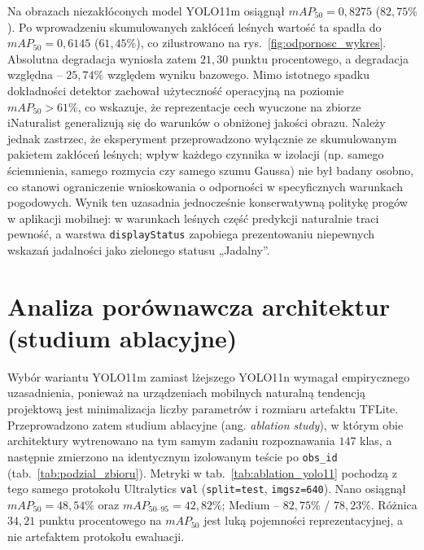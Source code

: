 Na obrazach niezakłóconych model YOLO11m osiągnął $mAP_{50}=0{,}8275$ ($82{,}75\%$). Po wprowadzeniu skumulowanych zakłóceń leśnych wartość ta spadła do $mAP_{50}=0{,}6145$ ($61{,}45\%$), co zilustrowano na rys.~\ref{fig:odpornosc_wykres}. Absolutna degradacja wyniosła zatem $21{,}30$ punktu procentowego, a degradacja względna – $25{,}74\%$ względem wyniku bazowego. Mimo istotnego spadku dokładności detektor zachował użyteczność operacyjną na poziomie $mAP_{50}>61\%$, co wskazuje, że reprezentacje cech wyuczone na zbiorze iNaturalist generalizują się do warunków o obniżonej jakości obrazu. Należy jednak zastrzec, że eksperyment przeprowadzono wyłącznie ze skumulowanym pakietem zakłóceń leśnych; wpływ każdego czynnika w izolacji (np. samego ściemnienia, samego rozmycia czy samego szumu Gaussa) nie był badany osobno, co stanowi ograniczenie wnioskowania o odporności w specyficznych warunkach pogodowych. Wynik ten uzasadnia jednocześnie konserwatywną politykę progów w aplikacji mobilnej: w warunkach leśnych część predykcji naturalnie traci pewność, a warstwa \texttt{displayStatus} zapobiega prezentowaniu niepewnych wskazań jadalności jako zielonego statusu „Jadalny”.

\section{Analiza porównawcza architektur (studium ablacyjne)}
Wybór wariantu YOLO11m zamiast lżejszego YOLO11n wymagał empirycznego uzasadnienia, ponieważ na urządzeniach mobilnych naturalną tendencją projektową jest minimalizacja liczby parametrów i rozmiaru artefaktu TFLite. Przeprowadzono zatem studium ablacyjne (ang. \textit{ablation study}), w którym obie architektury wytrenowano na tym samym zadaniu rozpoznawania $147$ klas, a następnie zmierzono na identycznym izolowanym teście po \texttt{obs\_id} (tab.~\ref{tab:podzial_zbioru}). Metryki w tab.~\ref{tab:ablation_yolo11} pochodzą z tego samego protokołu Ultralytics \texttt{val} (\texttt{split=test}, \texttt{imgsz=640}). Nano osiągnął $mAP_{50}=48{,}54\%$ oraz $mAP_{50\text{--}95}=42{,}82\%$; Medium -- $82{,}75\%$ / $78{,}23\%$. Różnica $34{,}21$ punktu procentowego na $mAP_{50}$ jest luką pojemności reprezentacyjnej, a nie artefaktem protokołu ewaluacji.

